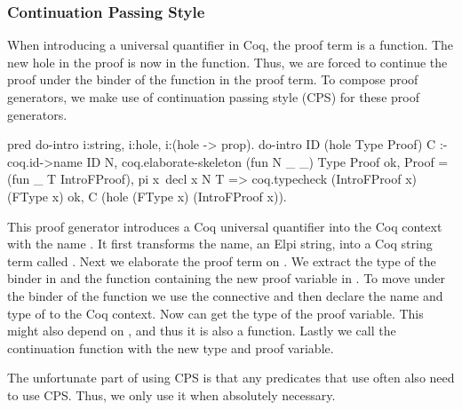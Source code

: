\documentclass[thesis.tex]{subfiles}
\begin{document}
{{{{\subsubsection{Continuation Passing Style}\label{ssec:cecps}
When introducing a universal quantifier in Coq, the proof term is a function. The new hole in the proof is now in the function. Thus, we are forced to continue the proof under the binder of the function in the proof term. To compose proof generators, we make use of continuation passing style (CPS) for these proof generators.
\begin{elpicode}
  pred do-intro i:string, i:hole, i:(hole -> prop).
  do-intro ID (hole Type Proof) C :-
    coq.id->name ID N,
    coq.elaborate-skeleton (fun N _ _) Type Proof ok,
    Proof = (fun _ T IntroFProof),
    pi x\ decl x N T =>
      coq.typecheck (IntroFProof x) (FType x) ok,
      C (hole (FType x) (IntroFProof x)).
\end{elpicode}
This proof generator introduces a Coq universal quantifier into the Coq context with the name . It first transforms the name, an Elpi string, into a Coq string term called . Next we elaborate the proof term  on . We extract the type of the binder in  and the function containing the new proof variable in . To move under the binder of the function we use the  connective and then declare the name and type of  to the Coq context. Now can get the type of the proof variable. This might also depend on , and thus it is also a function. Lastly we call the continuation function with the new type and proof variable.

The unfortunate part of using CPS is that any predicates that use  often also need to use CPS. Thus, we only use it when absolutely necessary.

}}}}
\end{document}
